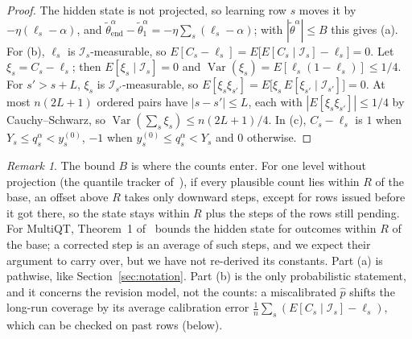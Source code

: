 \documentclass[11pt,a4paper]{article}
\theoremstyle{definition}
\theoremstyle{remark}
\newtheorem*{remark}{Remark}
\begin{document}
\begin{proof}
The hidden state is not projected, so learning row $s$ moves it by
$-\eta(\ell_s-\alpha)$, and
$\tilde\theta_{\mathrm{end}}^\alpha-\tilde\theta_1^\alpha
=-\eta\sum_s(\ell_s-\alpha)$; with $|\tilde\theta^\alpha|\le B$ this
gives (a). For (b), $\ell_s$ is $\mathcal I_s$-measurable, so
$E[C_s-\ell_s]=E\bigl[E[C_s\mid\mathcal I_s]-\ell_s\bigr]=0$. Let
$\xi_s=C_s-\ell_s$; then $E[\xi_s\mid\mathcal I_s]=0$ and
$\operatorname{Var}(\xi_s)=E[\ell_s(1-\ell_s)]\le1/4$. For $s'>s+L$,
$\xi_s$ is $\mathcal I_{s'}$-measurable, so
$E[\xi_s\xi_{s'}]=E\bigl[\xi_s\,E[\xi_{s'}\mid\mathcal I_{s'}]\bigr]=0$.
At most $n(2L+1)$ ordered pairs have $|s-s'|\le L$, each with
$|E[\xi_s\xi_{s'}]|\le1/4$ by Cauchy--Schwarz, so
$\operatorname{Var}(\sum_s\xi_s)\le n(2L+1)/4$. In (c), $C_s-\ell_s$ is
$1$ when $Y_s\le q_s^\alpha<y_s^{(0)}$, $-1$ when
$y_s^{(0)}\le q_s^\alpha<Y_s$ and $0$ otherwise.
\end{proof}

\begin{remark}
The bound $B$ is where the counts enter. For one level without projection
(the quantile tracker of~\cite{pid}), if every plausible count lies within
$R$ of the base, an offset above $R$ takes only downward steps, except for
rows issued before it got there, so the state stays within $R$ plus the
steps of the rows still pending. For MultiQT, Theorem~1
of~\cite{multiqt} bounds the hidden state for outcomes within $R$ of the
base; a corrected step is an average of such steps, and we expect their
argument to carry over, but we have not re-derived its constants. Part
(a) is pathwise, like Section~\ref{sec:notation}. Part (b) is the only
probabilistic statement, and it concerns the revision model, not the
counts: a miscalibrated $\hat p$ shifts the long-run coverage by its
average calibration error
$\frac1n\sum_s(E[C_s\mid\mathcal I_s]-\ell_s)$, which can be checked on
past rows (below).
\end{remark}
\end{document}
